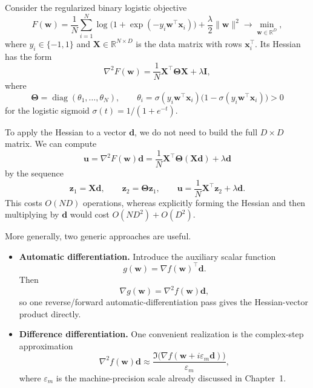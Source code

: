 \begin{example}
\label{ex:ch6-logreg-hv}
Consider the regularized binary logistic objective
\begin{equation}
  \label{eq:ch6-logreg}
  F(\mathbf{w})
  =\frac{1}{N}\sum_{i=1}^{N}
  \log\bigl(1+\exp(-y_i \mathbf{w}^{\top}\mathbf{x}_i)\bigr)
  +\frac{\lambda}{2}\|\mathbf{w}\|^2
  \to \min_{\mathbf{w}\in\mathbb{R}^D},
\end{equation}
where $y_i\in\{-1,1\}$ and $\mathbf{X}\in\mathbb{R}^{N\times D}$ is the data
matrix with rows $\mathbf{x}_i^\top$. Its Hessian has the form
\[
  \nabla^2 F(\mathbf{w})
  =\frac{1}{N}\mathbf{X}^{\top}\boldsymbol{\Theta}\mathbf{X}
  +\lambda \mathbf{I},
\]
where
\[
  \boldsymbol{\Theta}=\operatorname{diag}(\theta_1,\dots,\theta_N),
  \qquad
  \theta_i=
  \sigma(y_i\mathbf{w}^\top \mathbf{x}_i)
  \bigl(1-\sigma(y_i\mathbf{w}^\top \mathbf{x}_i)\bigr)>0
\]
for the logistic sigmoid $\sigma(t)=1/(1+e^{-t})$.

To apply the Hessian to a vector $\mathbf{d}$, we do not need to build the
full $D\times D$ matrix. We can compute
\[
  \mathbf{u}=\nabla^2 F(\mathbf{w})\mathbf{d}
  =\frac1N \mathbf{X}^{\top}\boldsymbol{\Theta}(\mathbf{X}\mathbf{d})
  +\lambda \mathbf{d}
\]
by the sequence
\[
  \mathbf{z}_1=\mathbf{X}\mathbf{d},
  \qquad
  \mathbf{z}_2=\boldsymbol{\Theta}\mathbf{z}_1,
  \qquad
  \mathbf{u}=\frac1N \mathbf{X}^{\top}\mathbf{z}_2+\lambda \mathbf{d}.
\]
This costs $O(ND)$ operations, whereas explicitly forming the Hessian and then
multiplying by $\mathbf{d}$ would cost $O(ND^2)+O(D^2)$.
\end{example}

More generally, two generic approaches are useful.
\begin{itemize}
  \item \textbf{Automatic differentiation.} Introduce the auxiliary scalar
  function
  \[
    g(\mathbf{w})=\nabla f(\mathbf{w})^\top \mathbf{d}.
  \]
  Then
  \[
    \nabla g(\mathbf{w})=\nabla^2 f(\mathbf{w})\mathbf{d},
  \]
  so one reverse/forward automatic-differentiation pass gives the
  Hessian-vector product directly.
  \item \textbf{Difference differentiation.} One convenient realization is the
  complex-step approximation
  \[
    \nabla^2 f(\mathbf{w})\mathbf{d}
    \approx
    \frac{\Im\bigl(\nabla f(\mathbf{w}+ i\varepsilon_m \mathbf{d})\bigr)}
    {\varepsilon_m},
  \]
  where $\varepsilon_m$ is the machine-precision scale already discussed in
  Chapter~1.
\end{itemize}

